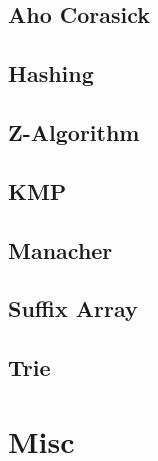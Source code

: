 		\subsection{Aho Corasick}
			
		\subsection{Hashing}
			
		\subsection{Z-Algorithm}
			
		\subsection{KMP}
			
		\subsection{Manacher}
			
		\subsection{Suffix Array}
			
		\subsection{Trie}
			
	\section{Misc}
